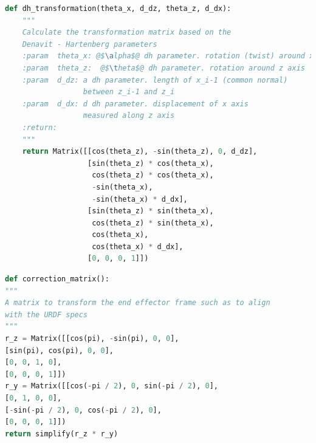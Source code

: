 \documentclass[a4paper,11pt]{article}
\begin{document}
\begin{lstlisting}[language=Python, caption={Transformation Matrix based on DH parameters}, label={code:DH parameters}]
def dh_transformation(theta_x, d_dz, theta_z, d_dx):
    """
    Calculate the transformation matrix based on the
    Denavit - Hartenberg parameters
    :param  theta_x: @$\alpha$@ dh parameter. rotation (twist) around x axis
    :param  theta_z:  @$\theta$@ dh parameter. rotation around z axis
    :param  d_dz: a dh parameter. length of x_i-1 (common normal)
                  between z_i-1 and z_i
    :param  d_dx: d dh parameter. displacement of x axis
                  measured along z axis
    :return:
    """
    return Matrix([[cos(theta_z), -sin(theta_z), 0, d_dz],
                   [sin(theta_z) * cos(theta_x), 
                    cos(theta_z) * cos(theta_x),
                    -sin(theta_x),
                    -sin(theta_x) * d_dx],
                   [sin(theta_z) * sin(theta_x),
                    cos(theta_z) * sin(theta_x),
                    cos(theta_x),
                    cos(theta_x) * d_dx],
                   [0, 0, 0, 1]])

\end{lstlisting} 


\begin{minipage}{\linewidth}
\begin{lstlisting}[language=Python, caption={Correction Matrix}, label={code:correction matrix}]
def correction_matrix():
"""
A matrix to transform the end effector frame such as to align
with the URDF specs
"""
r_z = Matrix([[cos(pi), -sin(pi), 0, 0],
[sin(pi), cos(pi), 0, 0],
[0, 0, 1, 0],
[0, 0, 0, 1]])
r_y = Matrix([[cos(-pi / 2), 0, sin(-pi / 2), 0],
[0, 1, 0, 0],
[-sin(-pi / 2), 0, cos(-pi / 2), 0],
[0, 0, 0, 1]])
return simplify(r_z * r_y)
\end{lstlisting}
\end{minipage}
\end{document}
